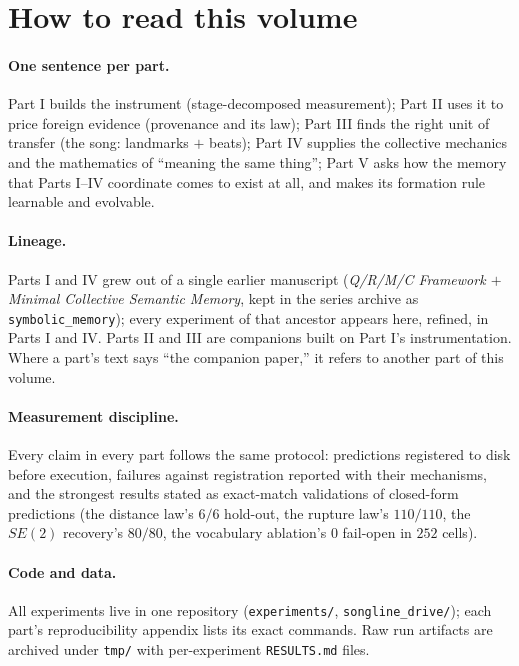 \documentclass{article}
\begin{document}
\section*{How to read this volume}

\paragraph{One sentence per part.} Part I builds the instrument
(stage-decomposed measurement); Part II uses it to price foreign
evidence (provenance and its law); Part III finds the right unit of
transfer (the song: landmarks $+$ beats); Part IV supplies the
collective mechanics and the mathematics of ``meaning the same
thing''; Part V asks how the memory that Parts I--IV coordinate comes
to exist at all, and makes its formation rule learnable and evolvable.

\paragraph{Lineage.} Parts I and IV grew out of a single earlier
manuscript (\emph{Q/R/M/C Framework $+$ Minimal Collective Semantic
Memory}, kept in the series archive as \texttt{symbolic\_memory});
every experiment of that ancestor appears here, refined, in Parts I
and IV. Parts II and III are companions built on Part I's
instrumentation. Where a part's text says ``the companion paper,'' it
refers to another part of this volume.

\paragraph{Measurement discipline.} Every claim in every part follows
the same protocol: predictions registered to disk before execution,
failures against registration reported with their mechanisms, and the
strongest results stated as exact-match validations of closed-form
predictions (the distance law's $6/6$ hold-out, the rupture law's
$110/110$, the $SE(2)$ recovery's $80/80$, the vocabulary ablation's
$0$ fail-open in $252$ cells).

\paragraph{Code and data.} All experiments live in one repository
(\texttt{experiments/}, \texttt{songline\_drive/}); each part's
reproducibility appendix lists its exact commands. Raw run artifacts
are archived under \texttt{tmp/} with per-experiment
\texttt{RESULTS.md} files.
\end{document}
